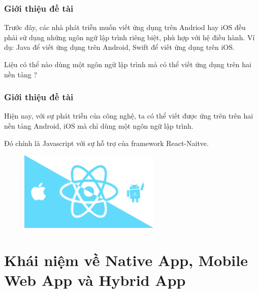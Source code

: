 \documentclass{beamer}
\begin{document}
\begin{frame}
\frametitle{Giới thiệu đề tài}

Trước đây, các nhà phát triễn muốn viết ứng dụng trên Andriod hay iOS đều phải sử dụng những ngôn ngữ lập trình riêng biệt, phù hợp với hệ điều hành. Ví dụ: Java để viết ứng dụng trên Android, Swift để viết ứng dụng trên iOS.

Liệu có thể nào dùng một ngôn ngữ lập trình mà có thể viết ứng dụng trên hai nền tảng ?

\end{frame}

\begin{frame}
\frametitle{Giới thiệu đề tài}

Hiện nay, với sự phát triễn của công nghệ, ta có thể viết được ứng trên trên hai nền tảng Android, iOS mà chỉ dùng một ngôn ngữ lập trình.

Đó chính là Javascript với sự hỗ trợ của framework React-Naitve.

\begin{figure}[h]
	\vspace{5pt}
	\centering
	\includegraphics[width=0.6\textwidth]{react-native}
\end{figure}

\end{frame}



\section{Khái niệm về Native App, Mobile Web App và Hybrid App}
\end{document}
